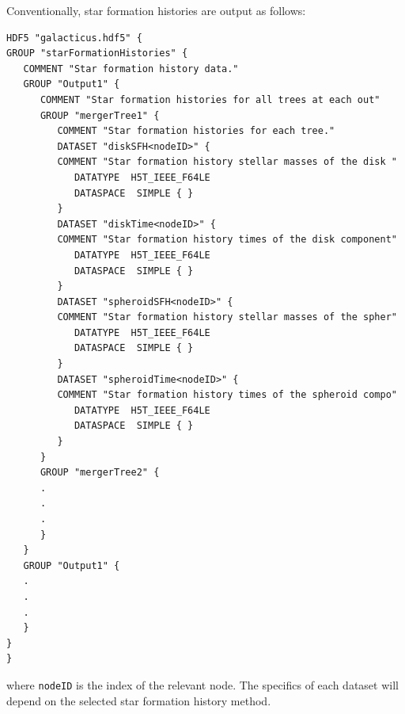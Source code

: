 Conventionally, star formation histories are output as follows:
\begin{verbatim}
HDF5 "galacticus.hdf5" {
GROUP "starFormationHistories" {
   COMMENT "Star formation history data."
   GROUP "Output1" {
      COMMENT "Star formation histories for all trees at each out"
      GROUP "mergerTree1" {
         COMMENT "Star formation histories for each tree."
         DATASET "diskSFH<nodeID>" {
         COMMENT "Star formation history stellar masses of the disk "
            DATATYPE  H5T_IEEE_F64LE
            DATASPACE  SIMPLE { }
         }
         DATASET "diskTime<nodeID>" {
         COMMENT "Star formation history times of the disk component"
            DATATYPE  H5T_IEEE_F64LE
            DATASPACE  SIMPLE { }
         }
         DATASET "spheroidSFH<nodeID>" {
         COMMENT "Star formation history stellar masses of the spher"
            DATATYPE  H5T_IEEE_F64LE
            DATASPACE  SIMPLE { }
         }
         DATASET "spheroidTime<nodeID>" {
         COMMENT "Star formation history times of the spheroid compo"
            DATATYPE  H5T_IEEE_F64LE
            DATASPACE  SIMPLE { }
         }
      }
      GROUP "mergerTree2" {
      .
      .
      .
      }
   }
   GROUP "Output1" {
   .
   .
   .
   }
}
}
\end{verbatim}
where {\tt nodeID} is the index of the relevant node. The specifics of each dataset will depend on the selected star formation history method.

